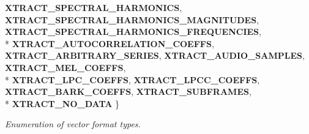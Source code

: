 \begin{DoxyCompactItemize}
{\bfseries X\-T\-R\-A\-C\-T\-\_\-\-S\-P\-E\-C\-T\-R\-A\-L\-\_\-\-H\-A\-R\-M\-O\-N\-I\-C\-S}, 
{\bfseries X\-T\-R\-A\-C\-T\-\_\-\-S\-P\-E\-C\-T\-R\-A\-L\-\_\-\-H\-A\-R\-M\-O\-N\-I\-C\-S\-\_\-\-M\-A\-G\-N\-I\-T\-U\-D\-E\-S}, 
{\bfseries X\-T\-R\-A\-C\-T\-\_\-\-S\-P\-E\-C\-T\-R\-A\-L\-\_\-\-H\-A\-R\-M\-O\-N\-I\-C\-S\-\_\-\-F\-R\-E\-Q\-U\-E\-N\-C\-I\-E\-S}, 
\\*
{\bfseries X\-T\-R\-A\-C\-T\-\_\-\-A\-U\-T\-O\-C\-O\-R\-R\-E\-L\-A\-T\-I\-O\-N\-\_\-\-C\-O\-E\-F\-F\-S}, 
{\bfseries X\-T\-R\-A\-C\-T\-\_\-\-A\-R\-B\-I\-T\-R\-A\-R\-Y\-\_\-\-S\-E\-R\-I\-E\-S}, 
{\bfseries X\-T\-R\-A\-C\-T\-\_\-\-A\-U\-D\-I\-O\-\_\-\-S\-A\-M\-P\-L\-E\-S}, 
{\bfseries X\-T\-R\-A\-C\-T\-\_\-\-M\-E\-L\-\_\-\-C\-O\-E\-F\-F\-S}, 
\\*
{\bfseries X\-T\-R\-A\-C\-T\-\_\-\-L\-P\-C\-\_\-\-C\-O\-E\-F\-F\-S}, 
{\bfseries X\-T\-R\-A\-C\-T\-\_\-\-L\-P\-C\-C\-\_\-\-C\-O\-E\-F\-F\-S}, 
{\bfseries X\-T\-R\-A\-C\-T\-\_\-\-B\-A\-R\-K\-\_\-\-C\-O\-E\-F\-F\-S}, 
{\bfseries X\-T\-R\-A\-C\-T\-\_\-\-S\-U\-B\-F\-R\-A\-M\-E\-S}, 
\\*
{\bfseries X\-T\-R\-A\-C\-T\-\_\-\-N\-O\-\_\-\-D\-A\-T\-A}
 \}
\begin{DoxyCompactList}\small\item\em Enumeration of vector format types. \end{DoxyCompactList}\end{DoxyCompactItemize}
